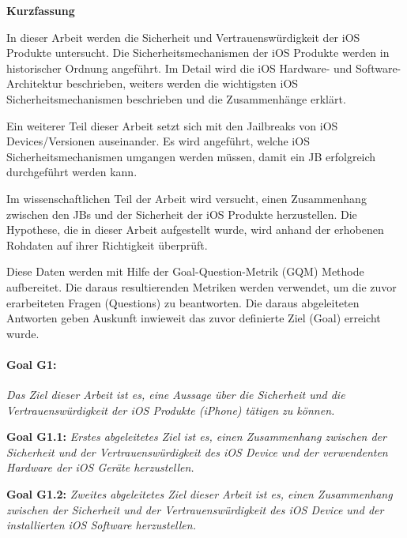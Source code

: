 %
%
% 
% 
% 



\cleardoublepage

\begin{center}
{\Large\bfseries Kurzfassung}
\end{center}
In dieser Arbeit werden die Sicherheit und Vertrauenswürdigkeit der iOS Produkte untersucht. Die Sicherheitsmechanismen der iOS Produkte werden in historischer Ordnung angeführt. Im Detail wird die iOS Hardware- und Software-Architektur beschrieben, weiters werden die wichtigsten iOS Sicherheitsmechanismen beschrieben und die Zusammenhänge erklärt. \par 
Ein weiterer Teil dieser Arbeit setzt sich mit den Jailbreaks von iOS Devices/Versionen auseinander. Es wird angeführt, welche iOS Sicherheitsmechanismen umgangen werden müssen, damit ein JB erfolgreich durchgeführt werden kann. \par 
Im wissenschaftlichen Teil der Arbeit wird versucht, einen Zusammenhang zwischen den JBs und der Sicherheit der iOS Produkte herzustellen. Die Hypothese, die in dieser Arbeit aufgestellt wurde, wird anhand der erhobenen Rohdaten auf ihrer Richtigkeit überprüft. \par
Diese Daten werden mit Hilfe der Goal-Question-Metrik (GQM) Methode aufbereitet. Die daraus resultierenden Metriken werden verwendet, um die zuvor erarbeiteten Fragen (Questions) zu beantworten. Die daraus abgeleiteten Antworten geben Auskunft inwieweit das zuvor definierte Ziel (Goal) erreicht wurde.\par 

\paragraph{Goal G1:}\textit{\glqq Das Ziel dieser Arbeit ist es, eine Aussage über die Sicherheit und die Vertrauenswürdigkeit der iOS Produkte (iPhone) tätigen zu können.\grqq{}} \par
\textbf{Goal G1.1:} \textit{\glqq Erstes abgeleitetes Ziel ist es, einen Zusammenhang zwischen der Sicherheit und der Vertrauenswürdigkeit des iOS Device und der verwendenten Hardware der iOS Geräte herzustellen.\grqq{}} \par 
\textbf{Goal G1.2:} \textit{\glqq Zweites abgeleitetes Ziel dieser Arbeit ist es, einen Zusammenhang zwischen der Sicherheit und der Vertrauenswürdigkeit des iOS Device und der installierten iOS Software herzustellen.\grqq{}}

